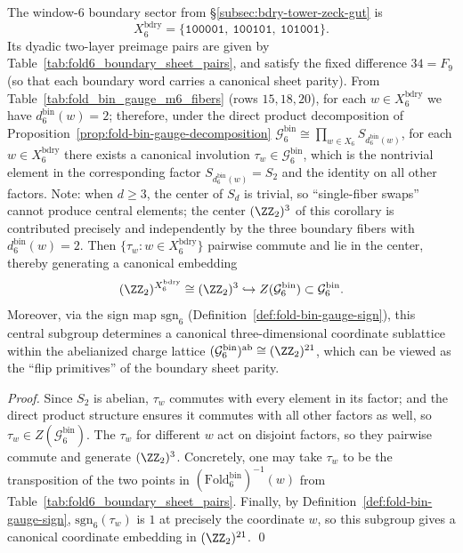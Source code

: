 \begin{corollary}\label{cor:fold-bin-boundary-center-z2}
The window-\(6\) boundary sector from \S\ref{subsec:bdry-tower-zeck-gut} is
\[
X^{\mathrm{bdry}}_6=\{\texttt{100001},\ \texttt{100101},\ \texttt{101001}\}.
\]
Its dyadic two-layer preimage pairs are given by Table~\ref{tab:fold6_boundary_sheet_pairs}, and satisfy the fixed difference \(34=F_9\) (so that each boundary word carries a canonical sheet parity).
From Table~\ref{tab:fold_bin_gauge_m6_fibers} (rows \(15,18,20\)), for each \(w\in X^{\mathrm{bdry}}_6\) we have \(d^{\mathrm{bin}}_6(w)=2\);
therefore, under the direct product decomposition of Proposition~\ref{prop:fold-bin-gauge-decomposition}
\(
\mathcal{G}^{\mathrm{bin}}_6\cong \prod_{w\in X_6}S_{d^{\mathrm{bin}}_6(w)}
\),
for each \(w\in X^{\mathrm{bdry}}_6\) there exists a canonical involution \(\tau_w\in \mathcal{G}^{\mathrm{bin}}_6\),
which is the nontrivial element in the corresponding factor \(S_{d^{\mathrm{bin}}_6(w)}=S_2\) and the identity on all other factors.
Note: when \(d\ge 3\), the center of \(S_d\) is trivial, so ``single-fiber swaps'' cannot produce central elements; the center \((\ZZ_2)^3\) of this corollary is contributed precisely and independently by the three boundary fibers with \(d^{\mathrm{bin}}_6(w)=2\).
Then \(\{\tau_w:w\in X^{\mathrm{bdry}}_6\}\) pairwise commute and lie in the center, thereby generating a canonical embedding
\[
(\ZZ_2)^{X^{\mathrm{bdry}}_6}\cong (\ZZ_2)^3\hookrightarrow Z(\mathcal{G}^{\mathrm{bin}}_6)\subset \mathcal{G}^{\mathrm{bin}}_6.
\]
Moreover, via the sign map \(\mathrm{sgn}_6\) (Definition~\ref{def:fold-bin-gauge-sign}), this central subgroup determines a canonical three-dimensional coordinate sublattice within the abelianized charge lattice
\(
(\mathcal{G}^{\mathrm{bin}}_6)^{\mathrm{ab}}\cong (\ZZ_2)^{21}
\),
which can be viewed as the ``flip primitives'' of the boundary sheet parity.
\end{corollary}
\begin{proof}
Since \(S_2\) is abelian, \(\tau_w\) commutes with every element in its factor; and the direct product structure ensures it commutes with all other factors as well, so \(\tau_w\in Z(\mathcal{G}^{\mathrm{bin}}_6)\).
The \(\tau_w\) for different \(w\) act on disjoint factors, so they pairwise commute and generate \((\ZZ_2)^3\).
Concretely, one may take \(\tau_w\) to be the transposition of the two points in \((\mathrm{Fold}^{\mathrm{bin}}_6)^{-1}(w)\) from Table~\ref{tab:fold6_boundary_sheet_pairs}.
Finally, by Definition~\ref{def:fold-bin-gauge-sign}, \(\mathrm{sgn}_6(\tau_w)\) is \(1\) at precisely the coordinate \(w\), so this subgroup gives a canonical coordinate embedding in \((\ZZ_2)^{21}\). \qed
\end{proof}

